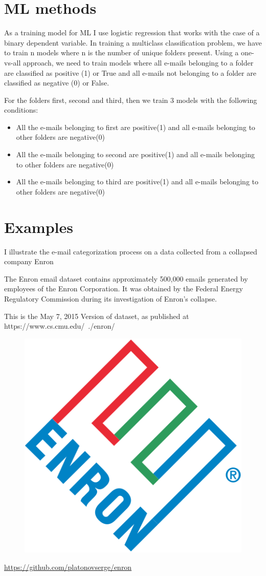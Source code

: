 \documentclass[11pt,fleqn]{book} %
\begin{document}
\section{ML methods}
As a training model for ML I use logistic regression that works with the case of a binary dependent variable. In training a multiclass classification problem, we have to train n models where n is the number of unique folders present. Using a one-vs-all approach, we need to train models where all e-mails belonging to a folder are classified as positive (1) or True and all e-mails not belonging to a folder are classified as negative (0) or False.

For the folders first, second and third, then we train 3 models with the following conditions:
\begin{itemize}
\item All the e-mails belonging to first are positive(1) and all e-mails belonging to other folders are negative(0)

\item All the e-mails belonging to second are positive(1) and all e-mails belonging to other folders are negative(0)

\item All the e-mails belonging to third are positive(1) and all e-mails belonging to other folders are negative(0)
\end{itemize}

\section{Examples}
I illustrate the e-mail categorization process on a data collected from a collapsed company Enron 
\begin{remark}
The Enron email dataset contains approximately 500,000 emails generated by employees of the Enron Corporation. It was obtained by the Federal Energy Regulatory Commission during its investigation of Enron's collapse.

This is the May 7, 2015 Version of dataset, as published at https://www.cs.cmu.edu/~./enron/
\begin{figure}[h]
\center
\includegraphics[width=0.3\linewidth]{Pictures/enron.png}
\end{figure}
\end{remark}
\url{https://github.com/platonovserge/enron}
\end{document}
